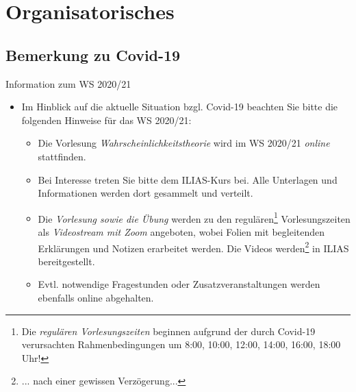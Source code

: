 \section{Organisatorisches}
\label{sec}



\subsection{Bemerkung zu Covid-19}



\begin{frame}[c]{Information zum WS 2020/21}
	\begin{itemize}
		\item Im Hinblick auf die aktuelle Situation bzgl. Covid-19 beachten Sie bitte die folgenden Hinweise für das WS 2020/21:
		
		\begin{itemize}
			\item Die Vorlesung \emph{Wahrscheinlichkeitstheorie} wird im WS 2020/21 \emph{online} stattfinden.
			
			\item Bei Interesse treten Sie bitte dem ILIAS-Kurs bei. Alle Unterlagen und Informationen werden dort gesammelt und verteilt.
			
			\bigskip
			
			\item Die \emph{Vorlesung sowie die Übung} werden zu den regulären\footnote{\scriptsize {} Die \emph{regulären Vorlesungszeiten} beginnen aufgrund der durch Covid-19 verursachten Rahmenbedingungen um 8:00, 10:00, 12:00, 14:00, 16:00, 18:00 Uhr!} Vorlesungszeiten als \emph{Videostream mit Zoom} angeboten, wobei Folien mit begleitenden Erklärungen und Notizen erarbeitet werden. Die Videos werden\footnote{\scriptsize ... nach einer gewissen Verzögerung...} in ILIAS bereitgestellt.


			\item Evtl. notwendige Fragestunden oder Zusatzveranstaltungen werden ebenfalls online abgehalten. 

		\end{itemize}
	\end{itemize}
\end{frame}





